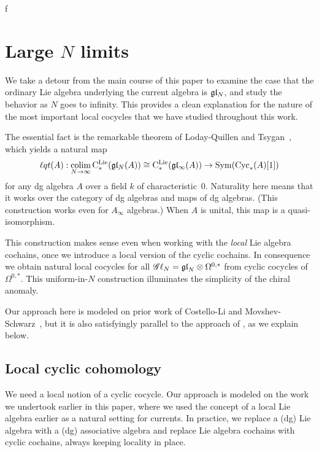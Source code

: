 f\section{Large $N$ limits} \label{sec: largeN}


\def\cycls{{\rm Cyc}_*}
\def\lqt{{\ell q t}}
\def\colim{{\rm colim}}
\def\sl{\mathfrak{sl}}

We take a detour from the main course of this paper to examine the case that the ordinary Lie algebra underlying the current algebra is $\mathfrak{g} \mathfrak{l}_N$, and study the behavior as $N$ goes to infinity.
This provides a clean explanation for the nature of the most important local cocycles that we have studied throughout this work.

The essential fact is the remarkable theorem of Loday-Quillen \cite{LQ} and Tsygan~\cite{Tsy},
which yields a natural map 
\[
\lqt(A) : \underset{N \to \infty}{\colim} \, \cliels(\gl_N(A)) \cong \cliels(\gl_\infty(A)) \to \Sym(\cycls(A)[1])
\]
for any dg algebra $A$ over a field $k$ of characteristic~0.
Naturality here means that it works over the category of dg algebras and maps of dg algebras.
(This construction works even for $A_\infty$ algebras.)
When $A$ is unital, this map is a quasi-isomorphism.

This construction makes sense even when working with the {\em local} Lie algebra cochains,
once we introduce a local version of the cyclic cochains.
In consequence we obtain natural local cocycles for all $\mathscr G \ell_{N} = {\mathfrak{gl}}_N \otimes \Omega^{0,*}$
from cyclic cocycles of $\Omega^{0,*}$.
This uniform-in-$N$ construction illuminates the simplicity of the chiral anomaly.

Our approach here is modeled on prior work of Costello-Li \cite{CLbcov2} and Movshev-Schwarz~\cite{MovSch},
but it is also satisfyingly parallel to the approach of \cite{FHK},
as we explain below.

\subsection{Local cyclic cohomology}

We need a local notion of a cyclic cocycle. 
Our approach is modeled on the work we undertook earlier in this paper,
where we used the concept of a local Lie algebra earlier as a natural setting for currents. 
In practice, we replace a (dg) Lie algebra with a (dg) associative algebra and replace Lie algebra cochains with cyclic cochains, 
always keeping locality in place.

